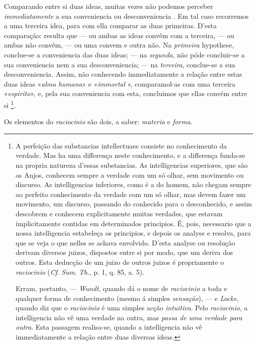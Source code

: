 Comparando entre si duas ideas, muitas vezes não podemos perceber \emph{immediatamente} a sua conveniencia ou desconveniencia  . Em tal caso recorremos a uma terceira idea, para com ella comparar as duas primeiras. D'esta comparação: resulta que --- ou ambas as ideas convêm com a terceira, --- ou ambas não convêm, --- ou uma convem e outra não. Na \emph{primeira} hypothese, conclue-se a conveniencia das duas ideas; --- na \emph{segunda}, não póde concluir-se a sua conveniencia nem a sua desconveniencia; --- na \emph{terceira}, conclue-se a sua desconveniencia. Assim, não conhecendo immediatamente a relação entre estas duas ideas «\emph{alma humana}» e «\emph{immortal} », comparamol-as com uma terceira «\emph{espirito}», e, pela sua conveniencia com esta, concluimos que ellas convém entre si \footnote{A perfeição das substancias intellectuaes consiste no conhecimento da verdade. Mas ha uma differença neste conhecimento, e a differença funda-se na propria natureza d'essas substancias. As intelligencias superiores, que são os Anjos, conhecem sempre a verdade com um só olhar, sem movimento ou discurso. As intelligencias inferiores, como é a do homem, não chegam sempre ao perfeito conhecimento da verdade com um só olhar, mas devem fazer um movimento, um discurso, passando do conhecido para o desconhecido, e assim descobrem e conhecem explicitamente muitas verdades, que estavam implicitamente contidas em determinados principios. É, pois, necessario que a nossa intelligencia estabeleça os principios, e depois os analyse e resolva, para que se veja o que nelles se achava envolvido. D'esta analyse ou resolução derivam diversos juizos, dispostos entre si por modo, que um deriva dos outros. Esta deducção de um juizo de outros juizos é propriamente o \emph{raciocinio} (\emph{Cf}. \emph{Sum}. \emph{Th}., p. 1, q. 85, a. 5).\par Erram, portanto, --- \emph{Wundt}, quando dá o nome de \emph{raciocinio} a toda e qualquer forma de conhecimento (mesmo á simples \emph{sensação}), --- e \emph{Locke}, quando diz que o \emph{raciocinio} é uma simples acção \emph{intuitiva}. Pelo \emph{raciocinio}, a intelligencia não vê uma verdade na outra, mas \emph{passa de uma verdade para outra}. Esta passagem realisa-se, quando a intelligencia não vê immediatamente a relação entre duas diversas ideas.}.


Os elementos do \emph{raciocinio} são dois, a saber: \emph{materia} e \emph{forma}.


